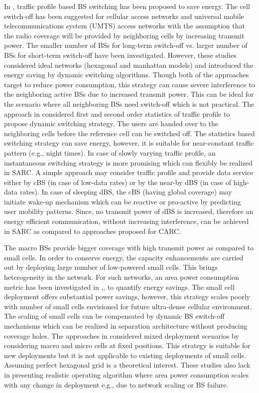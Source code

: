 \documentclass[article,10pt,twocolumn]{IEEEtran}
\begin{document}
In \citep{5208045, 5300273, 5683654}, traffic profile based BS switching has been proposed to save energy. The cell switch-off has been suggested for cellular access networks \citep{5208045} and universal mobile telecommunications system (UMTS)  access networks \citep{5300273} with the assumption that the radio coverage will be provided by neighboring cells by increasing transmit power. The smaller number of BSs for long-term switch-off vs. larger number of BSs for short-term switch-off have been investigated. However, these studies considered ideal networks (hexagonal and manhattan models) and introduced the energy saving by dynamic switching algorithms. Though both of the approaches \citep{5208045, 5300273} target to reduce power consumption, this strategy can cause severe interference to the neighboring active BSs due to increased transmit power. This can be ideal for the scenario where all neighboring BSs need switch-off which is not practical. The approach in \citep{5683654} considered first and second order statistics of traffic profile to propose dynamic switching strategy. The users are handed over to the neighboring cells before the reference cell can be switched off. The statistics based switching strategy can save energy, however, it is suitable for near-constant traffic pattern (e.g., night times). In case of slowly varying traffic profile, an instantaneous switching strategy is more promising which can flexibly be realized in SARC. A simple approach may consider traffic profile and provide data service either by cBS (in case of low-data rates) or by the near-by dBS (in case of high-data rates). In case of sleeping dBS, the cBS (having global coverage) may initiate wake-up mechanism which can be reactive or pro-active by predicting user mobility patterns. Since, no transmit power of dBS is increased, therefore an energy efficient communication, without increasing interference, can be achieved in SARC as compared to approaches proposed for CARC.

The macro BSs provide bigger coverage with high transmit power as compared to small cells. In order to conserve energy, the capacity enhancements are carried out by deploying large number of low-powered small cells. This brings heterogeneity in the network. For such networks, an area power consumption metric has been investigated in \citep{5360741},\citep{rost201011}, to quantify energy savings. The small cell deployment offers substantial power savings, however, this strategy scales poorly with number of small cells envisioned for future ultra-dense cellular environment. The scaling of small cells can be compensated by dynamic BS switch-off mechanisms which can be realized in separation architecture without producing coverage holes. The approaches in \citep{5360741, rost201011} considered mixed deployment scenarios by considering macro and micro cells at fixed positions. This strategy is suitable for new deployments but it is not applicable to existing deployments of small cells. Assuming perfect hexagonal grid is a theoretical interest. These studies also lack in presenting realistic operating algorithm where area power consumption scales with any change in deployment e.g., due to network scaling or BS failure.
\end{document}
